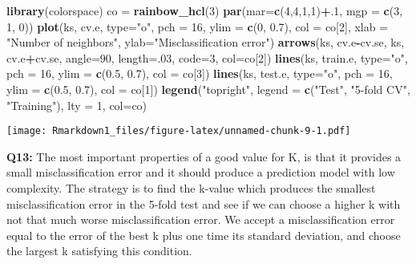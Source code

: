 \documentclass[]{article}
\newenvironment{Shaded}{\begin{snugshade}}{\end{snugshade}}
\newcommand{\KeywordTok}[1]{\textcolor[rgb]{0.13,0.29,0.53}{\textbf{#1}}}
\newcommand{\DataTypeTok}[1]{\textcolor[rgb]{0.13,0.29,0.53}{#1}}
\newcommand{\DecValTok}[1]{\textcolor[rgb]{0.00,0.00,0.81}{#1}}
\newcommand{\FloatTok}[1]{\textcolor[rgb]{0.00,0.00,0.81}{#1}}
\newcommand{\StringTok}[1]{\textcolor[rgb]{0.31,0.60,0.02}{#1}}
\newcommand{\OperatorTok}[1]{\textcolor[rgb]{0.81,0.36,0.00}{\textbf{#1}}}
\newcommand{\NormalTok}[1]{#1}
\begin{document}
\begin{Shaded}
\begin{Highlighting}[]
\KeywordTok{library}\NormalTok{(colorspace)}
\NormalTok{co =}\StringTok{ }\KeywordTok{rainbow_hcl}\NormalTok{(}\DecValTok{3}\NormalTok{)}
\KeywordTok{par}\NormalTok{(}\DataTypeTok{mar=}\KeywordTok{c}\NormalTok{(}\DecValTok{4}\NormalTok{,}\DecValTok{4}\NormalTok{,}\DecValTok{1}\NormalTok{,}\DecValTok{1}\NormalTok{)}\OperatorTok{+}\NormalTok{.}\DecValTok{1}\NormalTok{, }\DataTypeTok{mgp =} \KeywordTok{c}\NormalTok{(}\DecValTok{3}\NormalTok{, }\DecValTok{1}\NormalTok{, }\DecValTok{0}\NormalTok{))}
\KeywordTok{plot}\NormalTok{(ks, cv.e, }\DataTypeTok{type=}\StringTok{"o"}\NormalTok{, }\DataTypeTok{pch =} \DecValTok{16}\NormalTok{, }\DataTypeTok{ylim =} \KeywordTok{c}\NormalTok{(}\DecValTok{0}\NormalTok{, }\FloatTok{0.7}\NormalTok{), }\DataTypeTok{col =}\NormalTok{ co[}\DecValTok{2}\NormalTok{],}
     \DataTypeTok{xlab =} \StringTok{"Number of neighbors"}\NormalTok{, }\DataTypeTok{ylab=}\StringTok{"Misclassification error"}\NormalTok{)}
\KeywordTok{arrows}\NormalTok{(ks, cv.e}\OperatorTok{-}\NormalTok{cv.se, ks, cv.e}\OperatorTok{+}\NormalTok{cv.se, }\DataTypeTok{angle=}\DecValTok{90}\NormalTok{, }\DataTypeTok{length=}\NormalTok{.}\DecValTok{03}\NormalTok{, }\DataTypeTok{code=}\DecValTok{3}\NormalTok{, }\DataTypeTok{col=}\NormalTok{co[}\DecValTok{2}\NormalTok{])}
\KeywordTok{lines}\NormalTok{(ks, train.e, }\DataTypeTok{type=}\StringTok{"o"}\NormalTok{, }\DataTypeTok{pch =} \DecValTok{16}\NormalTok{, }\DataTypeTok{ylim =} \KeywordTok{c}\NormalTok{(}\FloatTok{0.5}\NormalTok{, }\FloatTok{0.7}\NormalTok{), }\DataTypeTok{col =}\NormalTok{ co[}\DecValTok{3}\NormalTok{])}
\KeywordTok{lines}\NormalTok{(ks, test.e, }\DataTypeTok{type=}\StringTok{"o"}\NormalTok{, }\DataTypeTok{pch =} \DecValTok{16}\NormalTok{, }\DataTypeTok{ylim =} \KeywordTok{c}\NormalTok{(}\FloatTok{0.5}\NormalTok{, }\FloatTok{0.7}\NormalTok{), }\DataTypeTok{col =}\NormalTok{ co[}\DecValTok{1}\NormalTok{])}
\KeywordTok{legend}\NormalTok{(}\StringTok{"topright"}\NormalTok{, }\DataTypeTok{legend =} \KeywordTok{c}\NormalTok{(}\StringTok{"Test"}\NormalTok{, }\StringTok{"5-fold CV"}\NormalTok{, }\StringTok{"Training"}\NormalTok{), }\DataTypeTok{lty =} \DecValTok{1}\NormalTok{, }\DataTypeTok{col=}\NormalTok{co)}
\end{Highlighting}
\end{Shaded}

\texttt{[image: Rmarkdown1\_files/figure-latex/unnamed-chunk-9-1.pdf]}

\textbf{Q13:} The most important properties of a good value for K, is
that it provides a small misclassification error and it should produce a
prediction model with low complexity. The strategy is to find the
k-value which produces the smallest misclassification error in the
5-fold test and see if we can choose a higher k with not that much worse
misclassification error. We accept a misclassification error equal to
the error of the best k plus one time its standard deviation, and choose
the largest k satisfying this condition.
\end{document}
